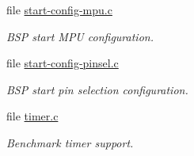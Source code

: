 \begin{DoxyCompactItemize}
file \mbox{\hyperlink{start-config-mpu_8c}{start-\/config-\/mpu.\+c}}
\begin{DoxyCompactList}\small\item\em B\+SP start M\+PU configuration. \end{DoxyCompactList}\item 
file \mbox{\hyperlink{start-config-pinsel_8c}{start-\/config-\/pinsel.\+c}}
\begin{DoxyCompactList}\small\item\em B\+SP start pin selection configuration. \end{DoxyCompactList}\item 
file \mbox{\hyperlink{arm_2lpc24xx_2start_2timer_8c}{timer.\+c}}
\begin{DoxyCompactList}\small\item\em Benchmark timer support. \end{DoxyCompactList}\end{DoxyCompactItemize}
